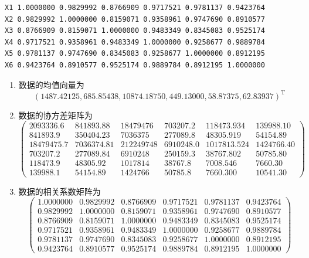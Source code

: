 \begin{enumerate}
\begin{lstlisting}
X1 1.0000000 0.9829992 0.8766909 0.9717521 0.9781137 0.9423764
X2 0.9829992 1.0000000 0.8159071 0.9358961 0.9747690 0.8910577
X3 0.8766909 0.8159071 1.0000000 0.9483349 0.8345083 0.9525174
X4 0.9717521 0.9358961 0.9483349 1.0000000 0.9258677 0.9889784
X5 0.9781137 0.9747690 0.8345083 0.9258677 1.0000000 0.8912195
X6 0.9423764 0.8910577 0.9525174 0.9889784 0.8912195 1.0000000
\end{lstlisting}
        \summary
        \begin{enumerate}[label=(\arabic*)]
            \item 数据的均值向量为
            \[(1487.42125,685.85438,10874.18750,449.13000,58.87375,62.83937)^{\mathrm{T}}\]
            \item 数据的协方差矩阵为
            \[\begin{pmatrix}
                2093336.6 & 841893.88 & 18479476 & 703207.2 & 118473.934 & 139988.10 \\
                841893.9 & 350404.23  & 7036375 & 277089.8 &  48305.919  & 54154.89 \\
                18479475.7 & 7036374.81 & 212249748 & 6910248.0 & 1017813.524 & 1424766.40 \\
                703207.2 & 277089.84 &  6910248 & 250159.3  & 38767.802  & 50785.80 \\
                118473.9 &  48305.92 &  1017814  & 38767.8  &  7008.546  &  7660.30 \\
                139988.1 &  54154.89  & 1424766 &  50785.8  &  7660.300 &  10541.30
            \end{pmatrix}\]
            \item 数据的相关系数矩阵为
            \[\begin{pmatrix}
                1.0000000 & 0.9829992 & 0.8766909 & 0.9717521 & 0.9781137 & 0.9423764 \\
                0.9829992 & 1.0000000 & 0.8159071 & 0.9358961 & 0.9747690 & 0.8910577 \\
                0.8766909 & 0.8159071 & 1.0000000 & 0.9483349 & 0.8345083 & 0.9525174 \\
                0.9717521 & 0.9358961 & 0.9483349 & 1.0000000 & 0.9258677 & 0.9889784 \\
                0.9781137 & 0.9747690 & 0.8345083 & 0.9258677 & 1.0000000 & 0.8912195 \\
                0.9423764 & 0.8910577 & 0.9525174 & 0.9889784 & 0.8912195 & 1.0000000
            \end{pmatrix}\]
        \end{enumerate}

\end{enumerate}
